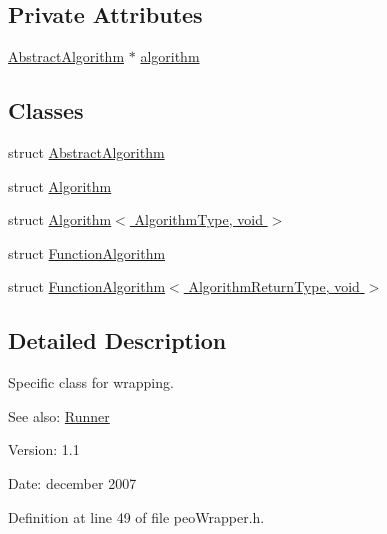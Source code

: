 \subsection*{Private Attributes}
\begin{CompactItemize}
\item 
\hyperlink{structpeoWrapper_1_1AbstractAlgorithm}{Abstract\-Algorithm} $\ast$ \hyperlink{classpeoWrapper_d191ac6d451db7aca86fed473b711346}{algorithm}
\end{CompactItemize}
\subsection*{Classes}
\begin{CompactItemize}
\item 
struct \hyperlink{structpeoWrapper_1_1AbstractAlgorithm}{Abstract\-Algorithm}
\item 
struct \hyperlink{structpeoWrapper_1_1Algorithm}{Algorithm}
\item 
struct \hyperlink{structpeoWrapper_1_1Algorithm_3_01AlgorithmType_00_01void_01_4}{Algorithm$<$ Algorithm\-Type, void $>$}
\item 
struct \hyperlink{structpeoWrapper_1_1FunctionAlgorithm}{Function\-Algorithm}
\item 
struct \hyperlink{structpeoWrapper_1_1FunctionAlgorithm_3_01AlgorithmReturnType_00_01void_01_4}{Function\-Algorithm$<$ Algorithm\-Return\-Type, void $>$}
\end{CompactItemize}


\subsection{Detailed Description}
Specific class for wrapping. 

\begin{Desc}
\item[See also:]\hyperlink{classRunner}{Runner} \end{Desc}
\begin{Desc}
\item[Version:]1.1 \end{Desc}
\begin{Desc}
\item[Date:]december 2007 \end{Desc}




Definition at line 49 of file peo\-Wrapper.h.


